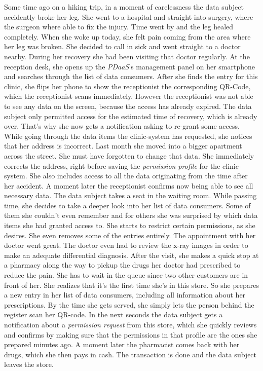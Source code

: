 \documentclass[12pt,english,a4paper,titlepage,cleardoublepage=empty,dottedtoc]{report}
\begin{document}
Some time ago on a hiking trip, in a moment of carelessness the data
subject accidently broke her leg. She went to a hospital and straight
into surgery, where the surgeon where able to fix the injury. Time went
by and the leg healed completely. When she woke up today, she felt pain
coming from the area where her leg was broken. She decided to call in
sick and went straight to a doctor nearby. During her recovery she had
been visiting that doctor regularly. At the reception desk, she opens up
the \emph{PDaaS}'s management panel on her smartphone and searches
through the list of data consumers. After she finds the entry for this
clinic, she flips her phone to show the receptionist the corresponding
QR-Code, which the receptionist scans immediately. However the
receptionist was not able to see any data on the screen, because the
access has already expired. The data subject only permitted access for
the estimated time of recovery, which is already over. That's why she
now gets a notification asking to re-grant some access. While going
through the data items the clinic-system has requested, she notices that
her address is incorrect. Last month she moved into a bigger apartment
across the street. She must have forgotten to change that data. She
immediately corrects the address, right before saving the
\emph{permission profile} for the clinic-system. She also includes
access to all the data originating from the time after her accident. A
moment later the receptionist confirms now being able to see all
necessary data. The data subject takes a seat in the waiting room. While
passing time, she decides to take a deeper look into her list of data
consumers. Some of them she couldn't even remember and for others she
was surprised by which data items she had granted access to. She starts
to restrict certain permissions, as she desires. She even removes some
of the entries entirely. The appointment with her doctor went great. The
doctor even had to review the x-ray images in order to make an adequate
differential diagnosis. After the visit, she makes a quick stop at a
pharmacy along the way to pickup the drugs her doctor had prescribed to
reduce the pain. She has to wait in the queue since two other customers
are in front of her. She realizes that it's the first time she's in this
store. So she prepares a new entry in her list of data consumers,
including all information about her prescriptions. By the time she gets
served, she simply lets the person behind the register scan her QR-code.
In the next seconds the data subject gets a notification about a
\emph{permission request} from this store, which she quickly reviews and
confirms by making sure that the permissions in that profile are the
ones she prepared minutes ago. A moment later the pharmacist comes back
with her drugs, which she then pays in cash. The transaction is done and
the data subject leaves the store.
\end{document}
